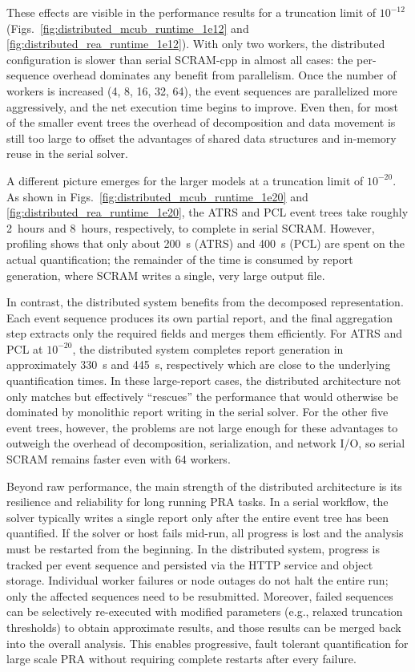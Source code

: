 These effects are visible in the performance results for a truncation limit of \(10^{-12}\) (Figs.~\ref{fig:distributed_mcub_runtime_1e12} and \ref{fig:distributed_rea_runtime_1e12}). With only two workers, the distributed configuration is slower than serial SCRAM-cpp in almost all cases: the per-sequence overhead dominates any benefit from parallelism. Once the number of workers is increased (4, 8, 16, 32, 64), the event sequences are parallelized more aggressively, and the net execution time begins to improve. Even then, for most of the smaller event trees the overhead of decomposition and data movement is still too large to offset the advantages of shared data structures and in-memory reuse in the serial solver.

A different picture emerges for the larger models at a truncation limit of \(10^{-20}\). As shown in Figs.~\ref{fig:distributed_mcub_runtime_1e20} and \ref{fig:distributed_rea_runtime_1e20}, the ATRS and PCL event trees take roughly 2~hours and 8~hours, respectively, to complete in serial SCRAM. However, profiling shows that only about 200~s (ATRS) and 400~s (PCL) are spent on the actual quantification; the remainder of the time is consumed by report generation, where SCRAM writes a single, very large output file.

In contrast, the distributed system benefits from the decomposed representation. Each event sequence produces its own partial report, and the final aggregation step extracts only the required fields and merges them efficiently. For ATRS and PCL at \(10^{-20}\), the distributed system completes report generation in approximately 330~s and 445~s, respectively which are close to the underlying quantification times. In these large-report cases, the distributed architecture not only matches but effectively “rescues” the performance that would otherwise be dominated by monolithic report writing in the serial solver. For the other five event trees, however, the problems are not large enough for these advantages to outweigh the overhead of decomposition, serialization, and network I/O, so serial SCRAM remains faster even with 64 workers.

Beyond raw performance, the main strength of the distributed architecture is its resilience and reliability for long running PRA tasks. In a serial workflow, the solver typically writes a single report only after the entire event tree has been quantified. If the solver or host fails mid-run, all progress is lost and the analysis must be restarted from the beginning. In the distributed system, progress is tracked per event sequence and persisted via the HTTP service and object storage. Individual worker failures or node outages do not halt the entire run; only the affected sequences need to be resubmitted. Moreover, failed sequences can be selectively re-executed with modified parameters (e.g., relaxed truncation thresholds) to obtain approximate results, and those results can be merged back into the overall analysis. This enables progressive, fault tolerant quantification for large scale PRA without requiring complete restarts after every failure.

